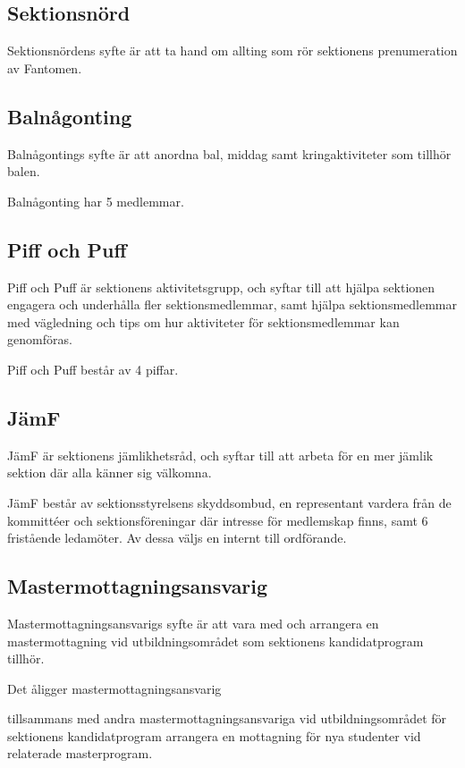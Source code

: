 \documentclass{styrdokument}
\begin{document}
\subsection{Sektionsnörd}
\? Sektionsnördens syfte är att ta hand om allting som rör sektionens prenumeration av Fantomen.

\subsection{Balnågonting}
\? Balnågontings syfte är att anordna bal, middag samt kringaktiviteter som tillhör balen.

\? Balnågonting har 5 medlemmar.

\subsection{Piff och Puff}
\? Piff och Puff är sektionens aktivitetsgrupp, och syftar till att hjälpa sektionen engagera och underhålla fler sektionsmedlemmar, samt hjälpa sektionsmedlemmar med vägledning och tips om hur aktiviteter för sektionsmedlemmar kan genomföras.

\? Piff och Puff består av 4 piffar.
		
\subsection{JämF}
\? JämF är sektionens jämlikhetsråd, och syftar till att arbeta för en mer jämlik sektion där alla känner sig välkomna.
	    
\? JämF består av sektionsstyrelsens skyddsombud, en representant vardera från de kommittéer och sektionsföreningar där intresse för medlemskap finns, samt 6 fristående ledamöter.
Av dessa väljs en internt till ordförande.
	    
\subsection{Mastermottagningsansvarig}
\? Mastermottagningsansvarigs syfte är att vara med och arrangera en mastermottagning vid utbildningsområdet som sektionens kandidatprogram tillhör.
        
\? Det åligger mastermottagningsansvarig
\begin{aligganden}
    \item tillsammans med andra mastermottagningsansvariga vid utbildningsområdet för sektionens kandidatprogram arrangera en mottagning för nya studenter vid relaterade masterprogram.
\end{aligganden}
        
\end{document}
